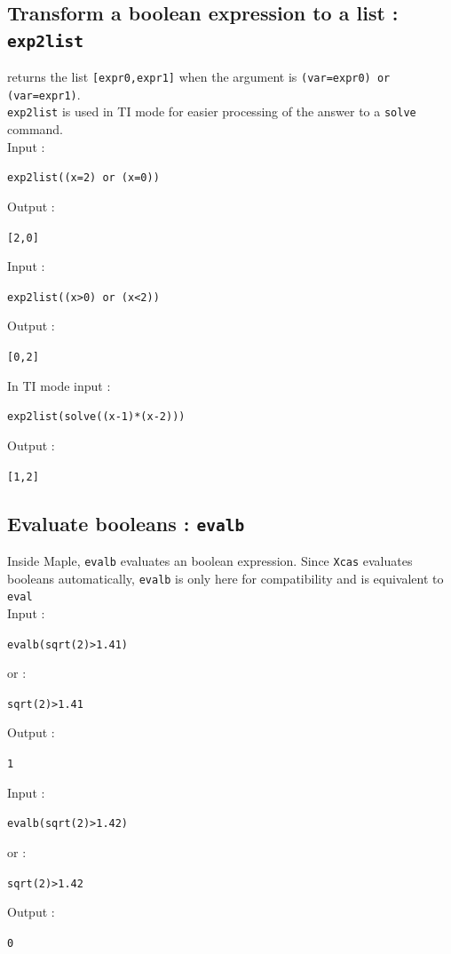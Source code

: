 \documentclass[a4paper,11pt]{book}
\begin{document}
\subsection{Transform a boolean expression to a list : {\tt exp2list}}
 returns the list {\tt [expr0,expr1]} when the argument 
is {\tt (var=expr0) or (var=expr1)}.\\
{\tt exp2list} is used in TI mode for easier processing of the answer to a
{\tt solve} command.\\
Input :
\begin{center}{\tt exp2list((x=2) or (x=0))}\end{center}
Output :
\begin{center}{\tt [2,0]}\end{center}
Input :
\begin{center}{\tt exp2list((x>0) or (x<2))}\end{center}
Output :
\begin{center}{\tt [0,2]}\end{center}
In TI mode input :
\begin{center}{\tt exp2list(solve((x-1)*(x-2)))}\end{center}
Output :
\begin{center}{\tt [1,2]}\end{center}

\subsection{Evaluate booleans : {\tt evalb}}
\noindent Inside Maple, {\tt evalb} evaluates an boolean expression.
Since {\tt Xcas} evaluates booleans automatically, {\tt evalb} is only
here for compatibility and is equivalent to {\tt eval}\\
Input :
\begin{center}{\tt evalb(sqrt(2)>1.41)}\end{center}
or :
\begin{center}{\tt sqrt(2)>1.41}\end{center}
Output :
\begin{center}{\tt 1}\end{center}
Input :
\begin{center}{\tt evalb(sqrt(2)>1.42)}\end{center}
or :
\begin{center}{\tt sqrt(2)>1.42}\end{center}
Output :
\begin{center}{\tt 0}\end{center}
\end{document}
